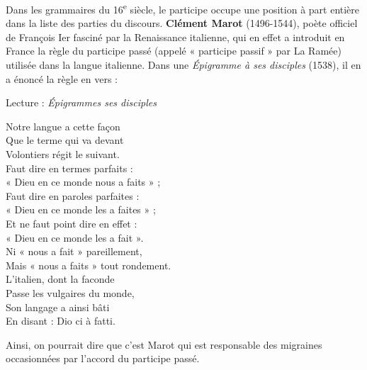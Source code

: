 Dans les grammaires du 16\textsuperscript{e} siècle, le participe occupe une position à part entière dans la liste des parties du discours. \textbf{Clément Marot} (1496-1544), poète officiel de François Ier fasciné par la Renaissance italienne, qui en effet a introduit en France la règle du participe passé (appelé « participe passif » par La Ramée) utilisée dans la langue italienne. Dans une \textit{Épigramme à ses disciples} (1538), il en a énoncé la règle en vers :
\begin{lecture}{Lecture : \textit{Épigrammes ses disciples}}
\begin{center}
Notre langue a cette façon\\
Que le terme qui va devant\\
Volontiers régit le suivant.\\
Faut dire en termes parfaits :\\
« Dieu en ce monde nous a faits » ;\\
Faut dire en paroles parfaites :\\
« Dieu en ce monde les a faites » ;\\
Et ne faut point dire en effet :\\
« Dieu en ce monde les a fait ».\\
Ni « nous a fait » pareillement,\\
Mais « nous a faits » tout rondement.\\
L’italien, dont la faconde\\
Passe les vulgaires du monde,\\
Son langage a ainsi bâti\\
En disant : Dio ci à fatti.
\end{center}
\end{lecture}
Ainsi, on pourrait dire que c’est Marot qui est responsable des migraines occasionnées par l’accord du participe passé.
